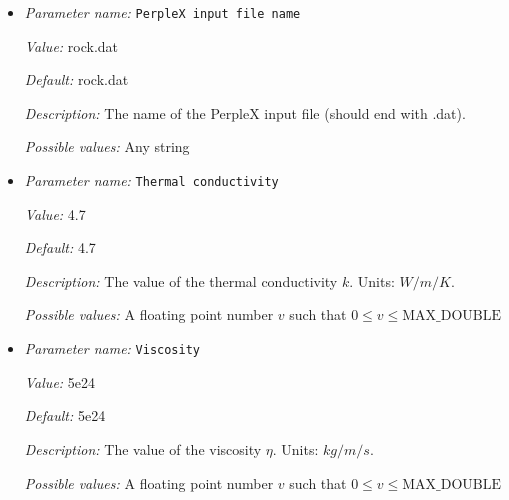 \begin{itemize}
{\it Value:} 0.


{\it Default:} 0.


{\it Description:} The value of the minimum temperature used to query PerpleX. Units: $K$.


{\it Possible values:} A floating point number $v$ such that $0 \leq v \leq \text{MAX\_DOUBLE}$
\item {\it Parameter name:} {\tt PerpleX input file name}
\label{parameters:Material model/PerpleX lookup model/PerpleX input file name}
\label{parameters:Material_20model/PerpleX_20lookup_20model/PerpleX_20input_20file_20name}


{\it Value:} rock.dat


{\it Default:} rock.dat


{\it Description:} The name of the PerpleX input file (should end with .dat).


{\it Possible values:} Any string
\item {\it Parameter name:} {\tt Thermal conductivity}
\label{parameters:Material model/PerpleX lookup model/Thermal conductivity}
\label{parameters:Material_20model/PerpleX_20lookup_20model/Thermal_20conductivity}


{\it Value:} 4.7


{\it Default:} 4.7


{\it Description:} The value of the thermal conductivity $k$. Units: $W/m/K$.


{\it Possible values:} A floating point number $v$ such that $0 \leq v \leq \text{MAX\_DOUBLE}$
\item {\it Parameter name:} {\tt Viscosity}
\label{parameters:Material model/PerpleX lookup model/Viscosity}
\label{parameters:Material_20model/PerpleX_20lookup_20model/Viscosity}


{\it Value:} 5e24


{\it Default:} 5e24


{\it Description:} The value of the viscosity $\eta$. Units: $kg/m/s$.


{\it Possible values:} A floating point number $v$ such that $0 \leq v \leq \text{MAX\_DOUBLE}$
\end{itemize}

